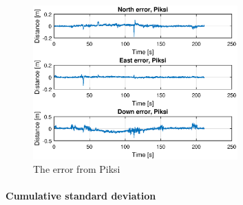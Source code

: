 \begin{figure}[H]
	\centering
		\includegraphics[width=0.7\textwidth]{figs/plots/errorPiksiWalk1.eps}
		\caption{The error from Piksi}
		\label{figure:errorPiksiwalk1}
\end{figure}
\paragraph{Cumulative standard deviation}~\\

